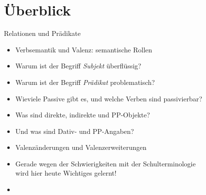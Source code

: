 
\section{Überblick}

\begin{frame}
  {Relationen und Prädikate}
  \pause
  \begin{itemize}[<+->]
    \item Verbsemantik und Valenz: semantische Rollen
      \Halbzeile
    \item Warum ist der Begriff \textit{Subjekt} überflüssig?
    \item Warum ist der Begriff \textit{Prädikat} problematisch?
    \item Wieviele Passive gibt es, und welche Verben sind passivierbar?
    \item Was sind direkte, indirekte und PP-Objekte?
    \item Und was sind Dativ- und PP-Angaben?
      \Halbzeile
    \item \alert{Valenzänderungen} und \alert{Valenzerweiterungen}
      \Halbzeile
    \item Gerade \alert{wegen} der Schwierigkeiten mit der Schulterminologie\\
      wird hier heute Wichtiges gelernt!
    \item \citet{Schaefer2018b}
  \end{itemize}

\end{frame}

